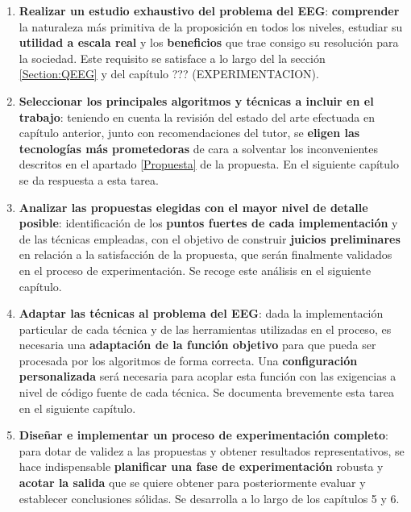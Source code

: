 \begin{enumerate}
	\item \label{tarea1} \textbf{Realizar un estudio exhaustivo del problema del EEG}: \textbf{comprender} la naturaleza más primitiva de la proposición en todos los niveles, estudiar su \textbf{utilidad a escala real} y los \textbf{beneficios} que trae consigo su resolución para la sociedad. Este requisito se satisface a lo largo del la sección \ref{Section:QEEG} y del capítulo ??? (EXPERIMENTACION).
	
	\item \label{tarea2} \textbf{Seleccionar los principales algoritmos y técnicas a incluir en el trabajo}: teniendo en cuenta la revisión del estado del arte efectuada en capítulo anterior, junto con recomendaciones del tutor, se \textbf{eligen las tecnologías más prometedoras} de cara a solventar los inconvenientes descritos en el apartado \ref{Propuesta} de la propuesta. En el siguiente capítulo se da respuesta a esta tarea.
	
	\item  \label{tarea3}\textbf{Analizar las propuestas elegidas con el mayor nivel de detalle posible}: identificación de los \textbf{puntos fuertes de cada implementación} y de las técnicas empleadas, con el objetivo de construir \textbf{juicios preliminares} en relación a la satisfacción de la propuesta, que serán finalmente validados en el proceso de experimentación. Se recoge este análisis en el siguiente capítulo.
	
	\item \label{tarea4} \textbf{Adaptar las técnicas al problema del EEG}: dada la implementación particular de cada técnica y de las herramientas utilizadas en el proceso, es necesaria una \textbf{adaptación de la función objetivo} para que pueda ser procesada por los algoritmos de forma correcta. Una \textbf{configuración personalizada} será necesaria para acoplar esta función con las exigencias a nivel de código fuente de cada técnica. Se documenta brevemente esta tarea en el siguiente capítulo.
	
	\item  \label{tarea5}\textbf{Diseñar e implementar un proceso de experimentación completo}: para dotar de validez a las propuestas y obtener resultados representativos, se hace indispensable \textbf{planificar una fase de experimentación} robusta y \textbf{acotar la salida} que se quiere obtener para posteriormente evaluar y establecer conclusiones sólidas. Se desarrolla a lo largo de los capítulos 5 y 6.
	

\end{enumerate}
